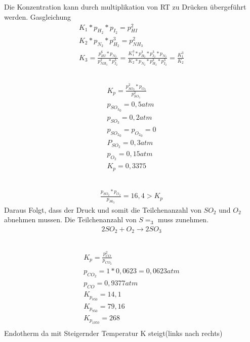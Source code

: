 \documentclass[a4paper]{article}
\begin{document}
\subsection{}
Die Konzentration kann durch multiplikation von RT zu Drücken übergeführt werden. Gasgleichung
\begin{align}
  K_1*p_{H_2}*p_{I_2}=p_{HI}^2 \\
  K_2*p_{N_2}*p_{H_2}^3=p_{NH_3}^2\\
  K_3=\frac{p_{HI}^6*p_{N_2}}{p_{NH_3}^2*p_{I_2}^3}=
  \frac{K_1^3*p_{H_2}^3*p_{I_2}^3*p_{N_2}}{K_2*p_{N_2}*p_{H_2}^3*p_{I_2}^3}=  \frac{K_1^3}{K_2}
\end{align}

\subsection{}
\begin{align}
  K_p=\frac{p_{SO_2}^2*p_{O_2}}{p_{SO_3}^2}\\
  p_{{SO_3}_0}=0,5 atm\\
  p_{SO_3}=0,2 atm\\
  p_{{SO_2}_0}=p_{{O_2}_0}=0\\
  P_{SO_2}=0,3 atm\\
  p_{O_2}=0,15 atm\\
  K_p = 0,3375
\end{align}

\subsection{}
\begin{align}
  \frac{p_{SO_2}*p_{O_2}}{p_{S0_3}}=16,4 > K_p
\end{align}
Daraus Folgt, dass der Druck und somit die Teilchenanzahl von $SO_2$ und $O_2$ abnehmen mussen. Die Teilchenanzahl von $S=_3$ muss zunehmen.
\begin{align}
  2SO_2 + O_2 \rightarrow 2SO_3
\end{align}

\subsection{}
\begin{align}
  K_p = \frac{p_{CO}^2}{p_{CO_2}}\\
  p_{CO_2}=1*0,0623=0,0623 atm\\
  p_{CO}=0,9377 atm\\
  K_{p_{850}}=14,1\\
  K_{p_{950}}=79,16\\
  K_{p_{1050}}=268\\ 
\end{align}
Endotherm da mit Steigernder Temperatur K steigt(links nach rechts)
\end{document}
